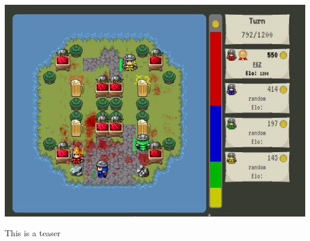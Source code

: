 \documentclass[siggraph, review=false]{acmart}
\begin{document}

\begin{teaserfigure}
  \includegraphics[width=\textwidth]{mine.jpg}
  \caption{This is a teaser}
  \label{fig:teaser}
\end{teaserfigure}


\maketitle




 
\end{document}
